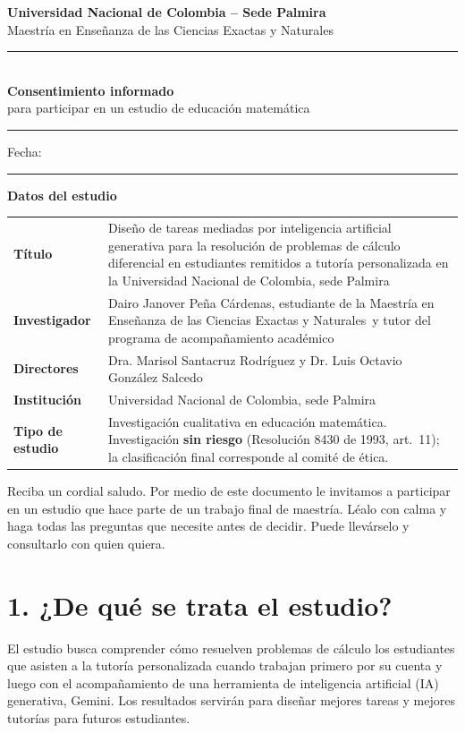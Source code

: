 \documentclass[11pt,letterpaper]{article}
\newcommand{\Titulo}{Diseño de tareas mediadas por inteligencia artificial generativa para la resolución de problemas de cálculo diferencial en estudiantes remitidos a tutoría personalizada en la Universidad Nacional de Colombia, sede Palmira}
\newcommand{\Investigador}{Dairo Janover Peña Cárdenas}
\newcommand{\Directores}{Dra. Marisol Santacruz Rodríguez y Dr. Luis Octavio González Salcedo}
\newcommand{\Programa}{Maestría en Enseñanza de las Ciencias Exactas y Naturales}
\newcommand{\linea}[1][6cm]{\rule{#1}{0.4pt}}
\newenvironment{caja}[1]{\par\medskip\noindent\textbf{#1}\par\smallskip\noindent\ignorespaces}{\par\medskip}
\begin{document}
\begin{center}
{\large\bfseries Universidad Nacional de Colombia -- Sede Palmira}\\[2pt]
{\Programa}\\[10pt]
\rule{\linewidth}{0.6pt}\\[4pt]
{\LARGE\bfseries Consentimiento informado}\\[4pt]
{\large para participar en un estudio de educación matemática}\\[4pt]
\rule{\linewidth}{0.6pt}
\end{center}

\noindent Fecha: \linea[4cm]

\begin{caja}{Datos del estudio}
\small
\begin{tabularx}{\linewidth}{@{}>{\bfseries}p{3.8cm}L@{}}
Título & \Titulo\\
Investigador & \Investigador, estudiante de la \Programa\ y tutor del programa de acompañamiento académico\\
Directores & \Directores\\
Institución & Universidad Nacional de Colombia, sede Palmira\\
Tipo de estudio & Investigación cualitativa en educación matemática. Investigación \textbf{sin riesgo} (Resolución 8430 de 1993, art.~11); la clasificación final corresponde al comité de ética.\\
\end{tabularx}
\end{caja}

\noindent Reciba un cordial saludo. Por medio de este documento le invitamos a participar en un estudio que hace parte de un trabajo final de maestría. Léalo con calma y haga todas las preguntas que necesite antes de decidir. Puede llevárselo y consultarlo con quien quiera.

\section*{1. ¿De qué se trata el estudio?}
El estudio busca comprender cómo resuelven problemas de cálculo los estudiantes que asisten a la tutoría personalizada cuando trabajan primero por su cuenta y luego con el acompañamiento de una herramienta de inteligencia artificial (IA) generativa, Gemini. Los resultados servirán para diseñar mejores tareas y mejores tutorías para futuros estudiantes.
\end{document}
